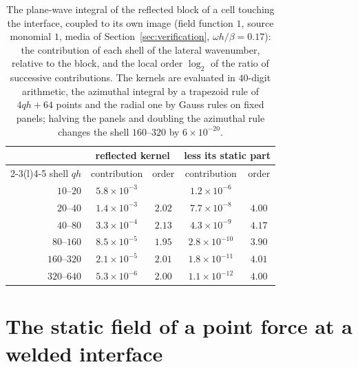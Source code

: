 \documentclass[11pt,a4paper]{article}
\begin{document}
\begin{table}[h]
\centering
\small
\begin{tabular}{rcccc}
\toprule
 & \multicolumn{2}{c}{reflected kernel} & \multicolumn{2}{c}{less its static part} \\
\cmidrule(lr){2-3}\cmidrule(l){4-5}
shell $qh$ & contribution & order & contribution & order \\
\midrule
$10$--$20$   & $5.8\times10^{-3}$  &        & $1.2\times10^{-6}$  &        \\
$20$--$40$   & $1.4\times10^{-3}$  & $2.02$ & $7.7\times10^{-8}$  & $4.00$ \\
$40$--$80$   & $3.3\times10^{-4}$  & $2.13$ & $4.3\times10^{-9}$  & $4.17$ \\
$80$--$160$  & $8.5\times10^{-5}$  & $1.95$ & $2.8\times10^{-10}$ & $3.90$ \\
$160$--$320$ & $2.1\times10^{-5}$  & $2.01$ & $1.8\times10^{-11}$ & $4.01$ \\
$320$--$640$ & $5.3\times10^{-6}$  & $2.00$ & $1.1\times10^{-12}$ & $4.00$ \\
\bottomrule
\end{tabular}
\caption{The plane-wave integral of the reflected block of a cell touching the interface, coupled to its own
image (field function $1$, source monomial $1$, media of Section~\ref{sec:verification}, $\omega h/\beta=0.17$):
the contribution of each shell of the lateral wavenumber, relative to the block, and the local order
$\log_2$ of the ratio of successive contributions. The kernels are evaluated in $40$-digit arithmetic, the
azimuthal integral by a trapezoid rule of $4qh+64$ points and the radial one by Gauss rules on fixed panels;
halving the panels and doubling the azimuthal rule changes the shell $160$--$320$ by $6\times10^{-20}$.}
\label{tab:subtraction}
\end{table}

\section{The static field of a point force at a welded interface}\label{sec:static}
\end{document}
